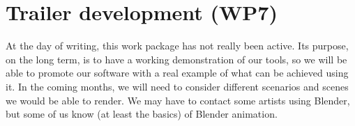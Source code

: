 \section{Trailer development (WP7)}

At the day of writing, this work package has not really been active. Its purpose, on the long term, is to have a working demonstration of our tools, so we will be able to promote our software with a real example of what can be achieved using it. In the coming months, we will need to consider different scenarios and scenes we would be able to render. We may have to contact some artists using Blender, but some of us know (at least the basics) of Blender animation.
